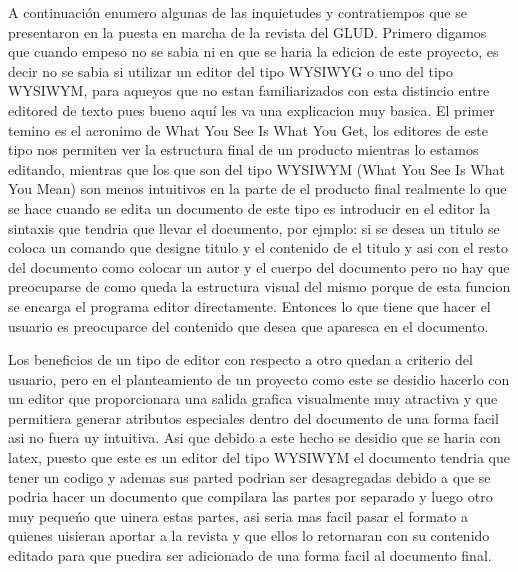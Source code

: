 \begin{multicols}{2}
A continuación enumero algunas de las inquietudes y contratiempos que se presentaron en la puesta en 
marcha de la revista del GLUD. Primero digamos que cuando empeso no se sabia ni en que se haria la 
edicion de este proyecto, es decir no se sabia si utilizar un editor del tipo WYSIWYG o uno del tipo 
WYSIWYM, para aqueyos que no estan familiarizados con esta distincio entre editored de texto pues 
bueno aquí les va una explicacion muy basica. El primer temino es el acronimo de What You See Is 
What You Get, los editores de este tipo nos permiten ver la estructura final de un producto mientras lo 
estamos editando, mientras que los que son del tipo WYSIWYM (What You See Is What You Mean) 
son menos intuitivos en la parte de el producto final realmente lo que se hace cuando se edita un 
documento de este tipo es introducir en el editor la sintaxis que tendria que llevar el documento, por 
ejmplo: si se desea un titulo se coloca un comando que designe titulo y el contenido de el titulo y asi 
con el resto del documento como colocar un autor y el cuerpo del documento pero no hay que 
preocuparse de como queda la estructura visual del mismo porque de esta funcion se encarga el 
programa editor directamente. Entonces lo que tiene que hacer el usuario es preocuparce  del contenido 
que desea que aparesca en el documento. 

Los beneficios de un tipo de editor con respecto a otro quedan a criterio del usuario, pero en el 
planteamiento de un proyecto como este se desidio hacerlo con un editor que proporcionara una salida 
grafica visualmente muy  atractiva y que permitiera generar atributos especiales dentro del documento 
de una forma facil asi no fuera uy intuitiva. Asi que debido a este hecho se desidio que se haria con 
latex, puesto que este es un editor del tipo  WYSIWYM el documento tendria que tener  un codigo y 
ademas sus parted podrian ser desagregadas debido a que se podria hacer un documento que compilara 
las partes por separado y luego otro muy pequeńo que uinera estas partes, asi seria mas facil pasar el 
formato a quienes uisieran aportar a la revista y que ellos lo retornaran con su contenido editado para 
que puedira ser adicionado de una forma facil al documento final.




\end{multicols}
